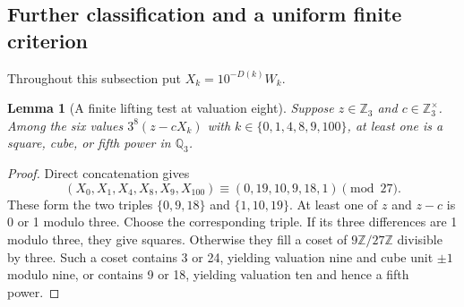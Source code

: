 \documentclass[10pt]{article}
\newtheorem{lemma}{Lemma}
\begin{document}
\subsection*{Further classification and a uniform finite criterion}
Throughout this subsection put $X_k=10^{-D(k)}W_k$.
\begin{lemma}[A finite lifting test at valuation eight]
Suppose $z\in\mathbb Z_3$ and $c\in\mathbb Z_3^\times$.
Among the six values $3^8(z-cX_k)$ with
$k\in\{0,1,4,8,9,100\}$, at least one is a square, cube, or fifth
power in $\mathbb Q_3$.
\end{lemma}
\begin{proof}
Direct concatenation gives
\[
 (X_0,X_1,X_4,X_8,X_9,X_{100})
 \equiv(0,19,10,9,18,1)\pmod{27}.
\]
These form the two triples $\{0,9,18\}$ and $\{1,10,19\}$.
At least one of $z$ and $z-c$ is 0 or 1 modulo three.
Choose the corresponding triple. If its three differences are 1
modulo three, they give squares. Otherwise they fill a coset of
$9\mathbb Z/27\mathbb Z$ divisible by three. Such a coset contains
3 or 24, yielding valuation nine and cube unit $\pm1$ modulo nine,
or contains 9 or 18, yielding valuation ten and hence a fifth power.
\end{proof}
\end{document}
